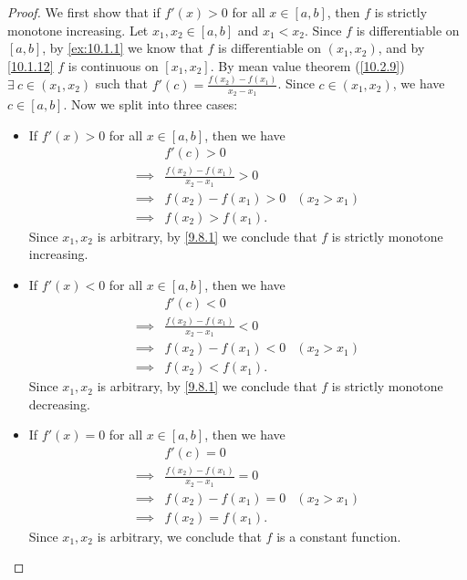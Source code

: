 \begin{proof}
  We first show that if \(f'(x) > 0\) for all \(x \in [a, b]\), then \(f\) is strictly monotone increasing.
  Let \(x_1, x_2 \in [a, b]\) and \(x_1 < x_2\).
  Since \(f\) is differentiable on \([a, b]\), by \cref{ex:10.1.1} we know that \(f\) is differentiable on \((x_1, x_2)\), and by \cref{10.1.12} \(f\) is continuous on \([x_1, x_2]\).
  By mean value theorem (\cref{10.2.9}) \(\exists\ c \in (x_1, x_2)\) such that \(f'(c) = \frac{f(x_2) - f(x_1)}{x_2 - x_1}\).
  Since \(c \in (x_1, x_2)\), we have \(c \in [a, b]\).
  Now we split into three cases:
  \begin{itemize}
    \item If \(f'(x) > 0\) for all \(x \in [a, b]\), then we have
          \begin{align*}
                     & f'(c) > 0                                           \\
            \implies & \frac{f(x_2) - f(x_1)}{x_2 - x_1} > 0               \\
            \implies & f(x_2) - f(x_1) > 0                   & (x_2 > x_1) \\
            \implies & f(x_2) > f(x_1).
          \end{align*}
          Since \(x_1, x_2\) is arbitrary, by \cref{9.8.1} we conclude that \(f\) is strictly monotone increasing.
    \item If \(f'(x) < 0\) for all \(x \in [a, b]\), then we have
          \begin{align*}
                     & f'(c) < 0                                           \\
            \implies & \frac{f(x_2) - f(x_1)}{x_2 - x_1} < 0               \\
            \implies & f(x_2) - f(x_1) < 0                   & (x_2 > x_1) \\
            \implies & f(x_2) < f(x_1).
          \end{align*}
          Since \(x_1, x_2\) is arbitrary, by \cref{9.8.1} we conclude that \(f\) is strictly monotone decreasing.
    \item If \(f'(x) = 0\) for all \(x \in [a, b]\), then we have
          \begin{align*}
                     & f'(c) = 0                                           \\
            \implies & \frac{f(x_2) - f(x_1)}{x_2 - x_1} = 0               \\
            \implies & f(x_2) - f(x_1) = 0                   & (x_2 > x_1) \\
            \implies & f(x_2) = f(x_1).
          \end{align*}
          Since \(x_1, x_2\) is arbitrary, we conclude that \(f\) is a constant function.
  \end{itemize}
\end{proof}

